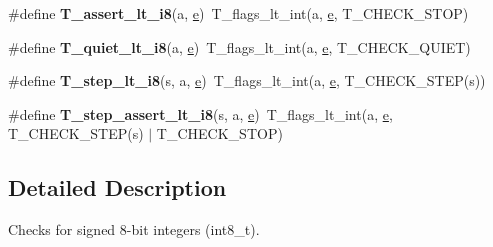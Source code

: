 \begin{DoxyCompactItemize}
\item 
\mbox{\label{group__RTEMSTestFrameworkChecksInt8_ga66047a4f599434cbd3b0af445317e67f}} 
\#define {\bfseries T\+\_\+assert\+\_\+lt\+\_\+i8}(a,  \mbox{\hyperlink{sun4u_2tte_8h_a8b0b9ed08e0e18920ec2682f48228c27}{e}})~T\+\_\+flags\+\_\+lt\+\_\+int(a, \mbox{\hyperlink{sun4u_2tte_8h_a8b0b9ed08e0e18920ec2682f48228c27}{e}}, T\+\_\+\+C\+H\+E\+C\+K\+\_\+\+S\+T\+OP)
\item 
\mbox{\label{group__RTEMSTestFrameworkChecksInt8_gaa5eee06305ee5bfe77a943334b7ba20a}} 
\#define {\bfseries T\+\_\+quiet\+\_\+lt\+\_\+i8}(a,  \mbox{\hyperlink{sun4u_2tte_8h_a8b0b9ed08e0e18920ec2682f48228c27}{e}})~T\+\_\+flags\+\_\+lt\+\_\+int(a, \mbox{\hyperlink{sun4u_2tte_8h_a8b0b9ed08e0e18920ec2682f48228c27}{e}}, T\+\_\+\+C\+H\+E\+C\+K\+\_\+\+Q\+U\+I\+ET)
\item 
\mbox{\label{group__RTEMSTestFrameworkChecksInt8_ga3ecec62c27257b5b9a42673ed302ff16}} 
\#define {\bfseries T\+\_\+step\+\_\+lt\+\_\+i8}(s,  a,  \mbox{\hyperlink{sun4u_2tte_8h_a8b0b9ed08e0e18920ec2682f48228c27}{e}})~T\+\_\+flags\+\_\+lt\+\_\+int(a, \mbox{\hyperlink{sun4u_2tte_8h_a8b0b9ed08e0e18920ec2682f48228c27}{e}}, T\+\_\+\+C\+H\+E\+C\+K\+\_\+\+S\+T\+EP(s))
\item 
\mbox{\label{group__RTEMSTestFrameworkChecksInt8_ga1a47d2ab56e623ee9c259e7aa9a17c24}} 
\#define {\bfseries T\+\_\+step\+\_\+assert\+\_\+lt\+\_\+i8}(s,  a,  \mbox{\hyperlink{sun4u_2tte_8h_a8b0b9ed08e0e18920ec2682f48228c27}{e}})~T\+\_\+flags\+\_\+lt\+\_\+int(a, \mbox{\hyperlink{sun4u_2tte_8h_a8b0b9ed08e0e18920ec2682f48228c27}{e}}, T\+\_\+\+C\+H\+E\+C\+K\+\_\+\+S\+T\+EP(s) $\vert$ T\+\_\+\+C\+H\+E\+C\+K\+\_\+\+S\+T\+OP)
\end{DoxyCompactItemize}


\subsection{Detailed Description}
Checks for signed 8-\/bit integers (int8\+\_\+t). 

